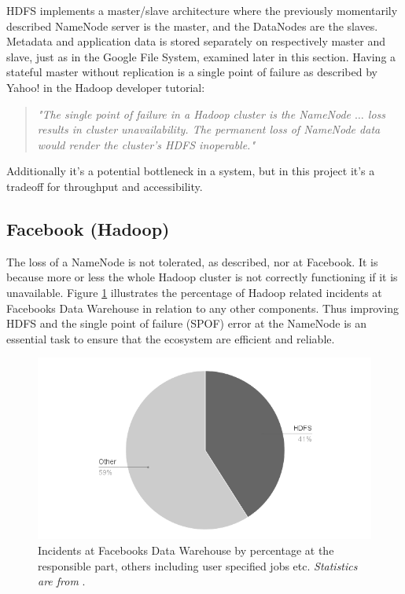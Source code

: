HDFS implements a master/slave architecture where the previously momentarily described NameNode server is the master, and the DataNodes are the slaves. Metadata and application data is stored separately on respectively master and slave, just as in the Google File System, examined later in this section. Having a stateful master without replication is a single point of failure  as described by Yahoo! in the Hadoop developer tutorial:

\begin{quotation}
	\textit{"The single point of failure in a Hadoop cluster is the NameNode $\ldots$ loss results in cluster unavailability. The permanent loss of NameNode data would render the cluster's HDFS inoperable."}\cite{YahooDocumentation}
\end{quotation}

Additionally it's a potential bottleneck in a system, but in this project it's a tradeoff for throughput and accessibility.

\subsection*{Facebook (Hadoop)}
The loss of a NameNode is not tolerated, as described, nor at Facebook. It is because more or less the whole Hadoop cluster is not correctly functioning if it is unavailable. Figure \ref{fig:fb-hadoop-incidents} illustrates the percentage of Hadoop related incidents at Facebooks Data Warehouse in relation to any other components. Thus improving HDFS and the single point of failure (SPOF) error at the NameNode is an essential task to ensure that the ecosystem are efficient and reliable.

\begin{figure}[h!]
	\centering
	\includegraphics[scale=0.48]{img/fb-hadoop-incidents.png}
	\caption[Incidents at Facebooks Data Warehouse]{Incidents at Facebooks Data Warehouse by percentage at the responsible part, others including user specified jobs etc. \newline \textit{Statistics are from }\cite{FacebookHadoopImprovement}. \label{fig:fb-hadoop-incidents}}
\end{figure}

